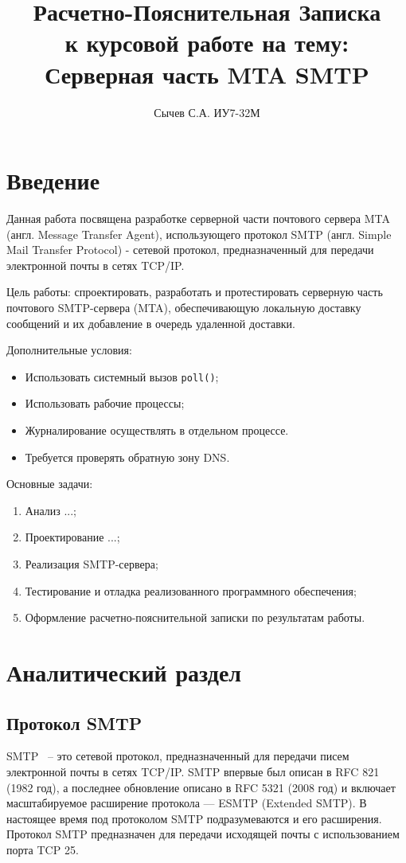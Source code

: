 \documentclass[a4paper,12pt]{report}
\title{Расчетно-Пояснительная Записка \\
    \large к курсовой работе на тему: \\ Серверная часть MTA SMTP}
\author{Сычев С.А. ИУ7-32М}
\begin{document}
\maketitle

\tableofcontents

\newpage
\chapter*{Введение}

Данная работа посвящена разработке серверной части почтового сервера MTA (англ. Message Transfer Agent), использующего протокол SMTP (англ. Simple Mail Transfer Protocol) - сетевой протокол, предназначенный для передачи электронной почты в сетях TCP/IP. 

Цель работы: спроектировать, разработать и протестировать серверную часть почтового SMTP-сервера (MTA), обеспечивающую локальную доставку сообщений и их добавление в очередь удаленной доставки. 

Дополнительные условия:
\begin{itemize}
\item Использовать системный вызов \texttt{poll()};
\item Использовать рабочие процессы;
\item Журналирование осуществлять в отдельном процессе.
\item Требуется проверять обратную зону DNS.
\end{itemize}

Основные задачи:
\begin{enumerate}
    \item Анализ ...;
    \item Проектирование ...;
    \item Реализация SMTP-сервера; 
    \item Тестирование и отладка реализованного программного обеспечения;
    \item Оформление расчетно-пояснительной записки по результатам работы.
\end{enumerate}

\newpage
\chapter{Аналитический раздел}

\section{Протокол SMTP}
SMTP ~-- это сетевой протокол, предназначенный для передачи писем электронной почты в сетях TCP/IP. SMTP впервые был описан в RFC 821 (1982 год), а последнее обновление описано в RFC 5321 (2008 год) и включает масштабируемое расширение протокола — ESMTP (Extended SMTP). В настоящее время под протоколом SMTP подразумеваются и его расширения. Протокол SMTP предназначен для передачи исходящей почты с использованием порта TCP 25.
\end{document}
